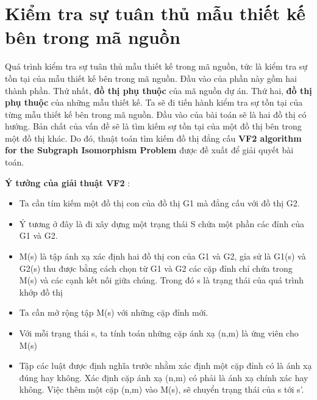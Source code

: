 \documentclass[12pt]{report}
\begin{document}
\section{Kiểm tra sự tuân thủ mẫu thiết kế bên trong mã nguồn}
Quá trình kiểm tra sự tuân thủ mẫu thiết kế trong mã nguồn, tức là kiểm tra sự tồn tại của mẫu thiết kế bên trong mã nguồn. Đầu vào của phần này gồm hai thành phần. Thứ nhất, \textbf{đồ thị phụ thuộc} của mã nguồn dự án. Thứ hai, \textbf{đồ thị phụ thuộc} của những mẫu thiết kế. Ta sẽ đi tiến hành kiểm tra sự tồn tại của từng mẫu thiết kế bên trong mã nguồn. 
Đầu vào của bài toán sẽ là hai đồ thị có hướng. Bản chất của vấn đề sẽ là tìm kiếm sự tồn tại của một đồ thị bên trong một đồ thị khác. Do đó, thuật toán tìm kiếm đồ thị đẳng cấu \textbf{VF2 algorithm for the Subgraph Isomorphism Problem} được đề xuất để giải quyết bài toán.

\noindent \textbf{Ý tưởng của giải thuật VF2} \cite{vf2_1368}:
\begin{itemize}
	\item Ta cần tím kiếm một đồ thị con của đồ thị G1 mà đẳng cấu với đồ thị G2.
	\item  Ý tương ở đây là đi xây dựng một trạng thái S chứa một phần các đỉnh của G1 và G2.
	
	\item M(s) là tập ánh xạ xác định hai đồ thị con của G1 và G2, gỉa sử là G1(s) và G2(s) thu được bằng cách chọn từ G1 và G2 các cặp đỉnh chỉ chứa trong M(s) và các cạnh kết nối giữa chúng. Trong đó s là trạng thái của quá trình khớp đồ thị
	\item Ta cần mở rộng tập M(s) với những cặp đỉnh mới.
	\item Với mỗi trạng thái s, ta tính toán những cặp ánh xạ (n,m) là ứng viên cho  M(s)
	\item Tập các luật được định nghĩa trước nhằm xác định một cặp đỉnh có là ánh xạ đúng hay không. Xác định cặp ánh xạ (n,m) có phải là ánh xạ chính xác hay không. Việc thêm một cặp (n,m) vào M(s), sẽ chuyển trạng thái của s tới s'.
\end{itemize}
\end{document}

